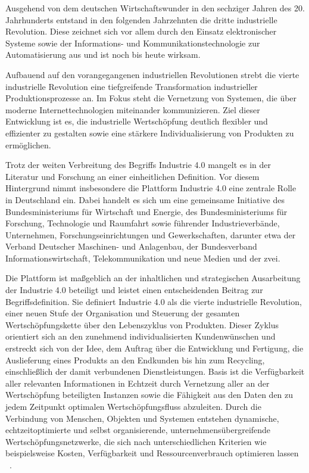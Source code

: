 Ausgehend von dem deutschen Wirtschaftswunder in den sechziger Jahren des 20. Jahrhunderts entstand in den folgenden Jahrzehnten die dritte industrielle Revolution.
Diese zeichnet sich vor allem durch den Einsatz elektronischer Systeme sowie der Informations- und Kommunikationstechnologie zur Automatisierung aus und ist noch bis heute wirksam.

Aufbauend auf den vorangegangenen industriellen Revolutionen strebt die vierte industrielle Revolution eine tiefgreifende Transformation industrieller Produktionsprozesse an. 
Im Fokus steht die Vernetzung von Systemen, die über moderne Internettechnologien miteinander kommunizieren.
Ziel dieser Entwicklung ist es, die industrielle Wertschöpfung deutlich flexibler und effizienter zu gestalten sowie eine stärkere Individualisierung von Produkten zu ermöglichen. 
\cite{Industrie4.0ProduktionAutomatisierung}\cite{EinführungundUmsetzungI4.0}

Trotz der weiten Verbreitung des Begriffs Industrie 4.0 mangelt es in der Literatur und Forschung an einer einheitlichen Definition.
Vor diesem Hintergrund nimmt insbesondere die Plattform Industrie 4.0 \cite{plattform_i40} eine zentrale Rolle in Deutschland ein. 
Dabei handelt es sich um eine gemeinsame Initiative des Bundesministeriums für Wirtschaft und Energie, des Bundesministeriums für Forschung, Technologie und Raumfahrt sowie führender Industrieverbände, Unternehmen, Forschungseinrichtungen und Gewerkschaften, darunter etwa der Verband Deutscher Maschinen- und Anlagenbau, der Bundesverband Informationswirtschaft, Telekommunikation und neue Medien und der \ac{zvei}.

Die Plattform ist maßgeblich an der inhaltlichen und strategischen Ausarbeitung der Industrie 4.0 beteiligt und leistet einen entscheidenden Beitrag zur Begriffsdefinition. 
Sie definiert Industrie 4.0 als
\glqq die vierte industrielle Revolution, einer neuen Stufe der Organisation und Steuerung der gesamten Wertschöpfungskette über den Lebenszyklus von Produkten.
Dieser Zyklus orientiert sich an den zunehmend individualisierten Kundenwünschen und erstreckt sich von der Idee, dem Auftrag über die Entwicklung und Fertigung, die Auslieferung eines Produkts an den Endkunden bis hin zum Recycling, einschließlich der damit verbundenen Dienstleistungen.
Basis ist die Verfügbarkeit aller relevanten Informationen in Echtzeit durch Vernetzung aller an der Wertschöpfung beteiligten Instanzen sowie die Fähigkeit aus den Daten den zu jedem Zeitpunkt optimalen Wertschöpfungsfluss abzuleiten. 
Durch die Verbindung von Menschen, Objekten und Systemen entstehen dynamische, echtzeitoptimierte und selbst organisierende, unternehmensübergreifende Wertschöpfungsnetzwerke, die sich nach unterschiedlichen Kriterien wie beispielsweise Kosten, Verfügbarkeit und Ressourcenverbrauch optimieren lassen \grqq~\cite[S. 8]{plattform_i40_definition}.

